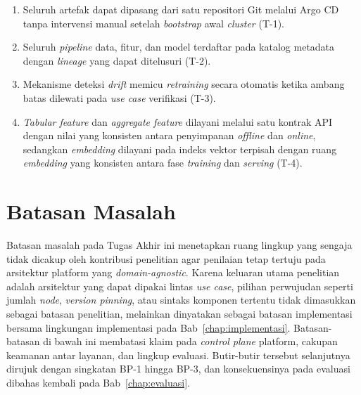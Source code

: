 \vspace{0.5em}
\begin{enumerate}
    \item Seluruh artefak dapat dipasang dari satu repositori Git melalui Argo CD tanpa intervensi manual setelah \textit{bootstrap} awal \textit{cluster} (T-1).

    \item Seluruh \textit{pipeline} data, fitur, dan model terdaftar pada katalog metadata dengan \textit{lineage} yang dapat ditelusuri (T-2).

    \item Mekanisme deteksi \textit{drift} memicu \textit{retraining} secara otomatis ketika ambang batas dilewati pada \textit{use case} verifikasi (T-3).

    \item \textit{Tabular feature} dan \textit{aggregate feature} dilayani melalui satu kontrak API dengan nilai yang konsisten antara penyimpanan \textit{offline} dan \textit{online}, sedangkan \textit{embedding} dilayani pada indeks vektor terpisah dengan ruang \textit{embedding} yang konsisten antara fase \textit{training} dan \textit{serving} (T-4).
\end{enumerate}

\section{Batasan Masalah}
\label{sec:batasan}

Batasan masalah pada Tugas Akhir ini menetapkan ruang lingkup yang sengaja tidak dicakup oleh kontribusi penelitian agar penilaian tetap tertuju pada arsitektur platform yang \textit{domain-agnostic}. Karena keluaran utama penelitian adalah arsitektur yang dapat dipakai lintas \textit{use case}, pilihan perwujudan seperti jumlah \textit{node}, \textit{version pinning}, atau sintaks komponen tertentu tidak dimasukkan sebagai batasan penelitian, melainkan dinyatakan sebagai batasan implementasi bersama lingkungan implementasi pada Bab~\ref{chap:implementasi}. Batasan-batasan di bawah ini membatasi klaim pada \textit{control plane} platform, cakupan keamanan antar layanan, dan lingkup evaluasi. Butir-butir tersebut selanjutnya dirujuk dengan singkatan BP-1 hingga BP-3, dan konsekuensinya pada evaluasi dibahas kembali pada Bab~\ref{chap:evaluasi}.

